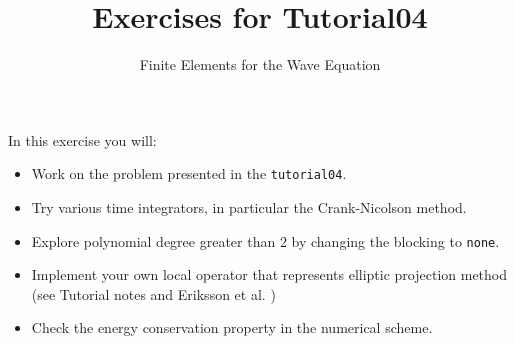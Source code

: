 \documentclass[12pt,a4paper]{article}
\title{\textbf{Exercises for Tutorial04}}
\subtitle{Finite Elements for the Wave  Equation}
\begin{document}
\exerciseheader

In this exercise you will:
\begin{itemize}
\item Work on the problem presented in the \lstinline{tutorial04}.
\item Try various time integrators, in particular the Crank-Nicolson method.
\item Explore polynomial degree greater than $2$ by changing the blocking
to \lstinline{none}.
\item Implement your own local operator that represents elliptic projection method (see Tutorial notes and Eriksson et al. \cite{Eriksson})
\item Check the energy conservation property in the numerical scheme.
\end{itemize}
\end{document}
